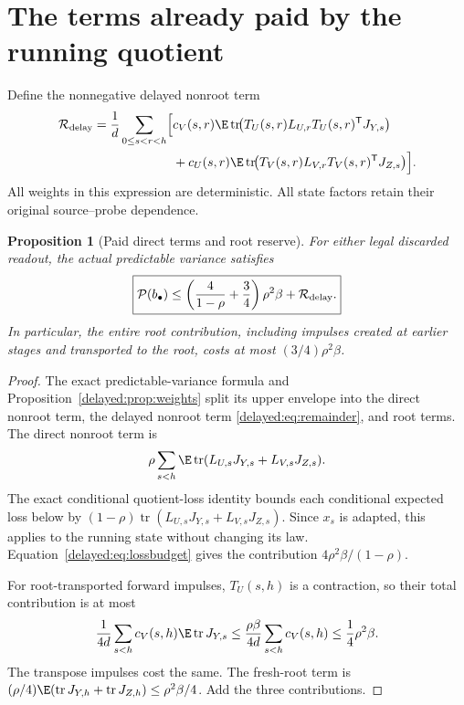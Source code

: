 \documentclass[11pt,oneside,openany,a4paper]{book}
\numberwithin{equation}{chapter}
\newtheorem{proposition}[theorem]{Proposition}
\theoremstyle{definition}
\theoremstyle{remark}
\newcommand{\T}{\mathsf T}\newcommand{\Id}{I}
\DeclareMathOperator{\tr}{tr}\DeclareMathOperator{\rank}{rank}
\begin{document}
\section{The terms already paid by the running quotient}
Define the nonnegative delayed nonroot term
\begin{equation}\label{delayed:eq:remainder}
\begin{split}
 \mathcal R_{\rm delay}={1\over d}
 \sum_{0\le s<r<h}\Bigl[&c_V(s,r)
 \E\tr\!\bigl(T_U(s,r)L_{U,r}T_U(s,r)^{\T}J_{Y,s}\bigr)\\
 &+c_U(s,r)
 \E\tr\!\bigl(T_V(s,r)L_{V,r}T_V(s,r)^{\T}J_{Z,s}\bigr)\Bigr].
\end{split}
\end{equation}
All weights in this expression are deterministic. All state factors
retain their original source--probe dependence.

\begin{proposition}[Paid direct terms and root reserve]\label{delayed:prop:paid}
For either legal discarded readout, the actual predictable variance
satisfies
\begin{equation}\label{delayed:eq:paid}
 \boxed{\displaystyle
 \mathcal P(b_\bullet)\le
 \left({4\over1-\rho}+{3\over4}\right)\rho^2\beta
 +\mathcal R_{\rm delay}.}
\end{equation}
In particular, the entire root contribution, including impulses created
at earlier stages and transported to the root, costs at most
$(3/4)\rho^2\beta$.
\end{proposition}
\begin{proof}
The exact predictable-variance formula and Proposition~\ref{delayed:prop:weights}
split its upper envelope into the direct nonroot term, the delayed
nonroot term \eqref{delayed:eq:remainder}, and root terms.
The direct nonroot term is
\[
 \rho\sum_{s<h}\E\tr(L_{U,s}J_{Y,s}+L_{V,s}J_{Z,s}).
\]
The exact conditional quotient-loss identity bounds each conditional
expected loss below by
$(1-\rho)\tr(L_{U,s}J_{Y,s}+L_{V,s}J_{Z,s})$.
Since $x_s$ is adapted, this applies to the running state without
changing its law. Equation~\eqref{delayed:eq:lossbudget} gives the contribution
$4\rho^2\beta/(1-\rho)$.

For root-transported forward impulses, $T_U(s,h)$ is a contraction,
so their total contribution is at most
\[
 {1\over4d}\sum_{s<h}c_V(s,h)\E\tr J_{Y,s}
 \le {\rho\beta\over4d}\sum_{s<h}c_V(s,h)
 \le\frac14\rho^2\beta.
\]
The transpose impulses cost the same. The fresh-root term is
$(\rho/4)\E(\tr J_{Y,h}+\tr J_{Z,h})\le\rho^2\beta/4$.
Add the three contributions.
\end{proof}
\end{document}
